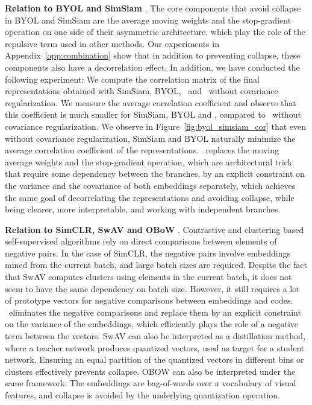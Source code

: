 \vspace{2mm}
\textbf{Relation to BYOL and SimSiam} \cite{grill2020byol, chen2020simsiam}. The core components that avoid collapse in BYOL and SimSiam are the average moving weights and the stop-gradient operation on one side of their asymmetric architecture, which play the role of the repulsive term used in other methods. Our experiments in Appendix~\ref{app:combination} show that in addition to preventing collapse, these components also have a decorrelation effect. In addition, we have conducted the following experiment: We compute the correlation matrix of the final representations obtained with SimSiam, BYOL, \algo \ and \algo \ without covariance regularization. We measure the average correlation coefficient and observe that this coefficient is much smaller for SimSiam, BYOL and \algo, compared to \algo \ without covariance regularization. We observe in Figure~\ref{fig:byol_simsiam_cor} that even without covariance regularization, SimSiam and BYOL naturally minimize the average correlation coefficient of the representations. \algo \ replaces the moving average weights and the stop-gradient operation, which are architectural trick that require some dependency between the branches, by an explicit constraint on the variance and the covariance of both embeddings separately, which achieves the same goal of decorrelating the representations and avoiding collapse, while being clearer, more interpretable, and working with independent branches.

\vspace{2mm}
\textbf{Relation to SimCLR, SwAV and OBoW} \cite{caron2020swav, chen2020simclr, gidaris2021obow}. Contrastive and clustering based self-supervised algorithms rely on direct comparisons between elements of negative pairs. In the case of SimCLR, the negative pairs involve embeddings mined from the current batch, and large batch sizes are required. Despite the fact that SwAV computes clusters using elements in the current batch, it does not seem to have the same dependency on batch size. However, it still requires a lot of prototype vectors for negative comparisons between embeddings and codes. \algo \ eliminates the negative comparisons and replace them by an explicit constraint on the variance of the embeddings, which efficiently plays the role of a negative term between the vectors. SwAV can also be interpreted as a distillation method, where a teacher network produces quantized vectors, used as target for a student network. Ensuring an equal partition of the quantized vectors in different bins or clusters effectively prevents collapse. OBOW can also be interpreted under the same framework. The embeddings are bag-of-words over a vocabulary of visual features, and collapse is avoided by the underlying quantization operation.


